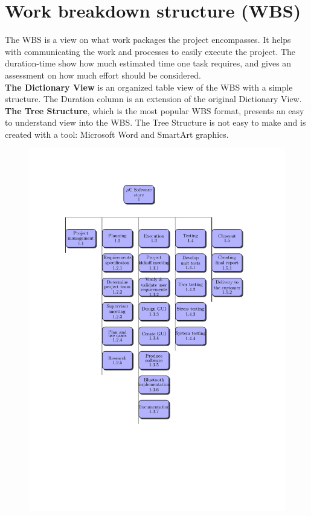 \section{Work breakdown structure (WBS)}
The WBS is a view on what work packages the project encompasses. It helps with communicating the work and processes to easily execute the project. The duration-time show how much estimated time one task requires, and gives an assessment on how much effort should be considered.\\
\newline
\textbf{The Dictionary View} is an organized table view of the WBS with a simple structure. The Duration column is an extension of the original Dictionary View.\\



\textbf{The Tree Structure}, which is the most popular WBS format, presents an easy to understand view into the WBS. The Tree Structure is not easy to make and is created with a tool: Microsoft Word and SmartArt graphics.\\

\begin{figure}[H]
\vspace*{-1.5in}
\hspace*{-1.2in}
\includegraphics[trim=0cm 4cm 0cm 0cm]{figures/wbs-tree.pdf}
\end{figure}
